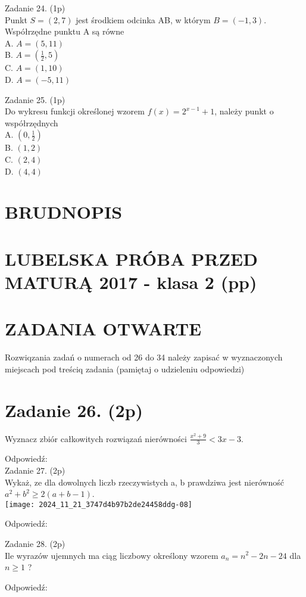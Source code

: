 \documentclass[10pt]{article}
\begin{document}
Zadanie 24. (1p)\\
Punkt \(S=(2,7)\) jest środkiem odcinka AB, w którym \(B=(-1,3)\). Współrzędne punktu A są równe\\
A. \(A=(5,11)\)\\
B. \(A=\left(\frac{1}{2}, 5\right)\)\\
C. \(A=(1,10)\)\\
D. \(A=(-5,11)\)

Zadanie 25. (1p)\\
Do wykresu funkcji określonej wzorem \(f(x)=2^{x-1}+1\), należy punkt o współrzędnych\\
A. \(\left(0, \frac{1}{2}\right)\)\\
B. \((1,2)\)\\
C. \((2,4)\)\\
D. \((4,4)\)

\section*{BRUDNOPIS}
\section*{LUBELSKA PRÓBA PRZED MATURĄ 2017 - klasa 2 (pp)}
\section*{ZADANIA OTWARTE}
Rozwiqzania zadań o numerach od 26 do 34 należy zapisać w wyznaczonych miejscach pod treściq zadania (pamiętaj o udzieleniu odpowiedzi)

\section*{Zadanie 26. (2p)}
Wyznacz zbiór całkowitych rozwiązań nierówności \(\frac{x^{2}+9}{3}<3 x-3\).

Odpowiedź:\\
Zadanie 27. (2p)\\
Wykaż, ze dla dowolnych liczb rzeczywistych a, b prawdziwa jest nierówność \(a^{2}+b^{2} \geq 2(a+b-1)\).\\
\texttt{[image: 2024\_11\_21\_3747d4b97b2de24458ddg-08]}

Odpowiedź:

Zadanie 28. (2p)\\
Ile wyrazów ujemnych ma ciąg liczbowy określony wzorem \(a_{n}=n^{2}-2 n-24\) dla \(n \geq 1\) ?

Odpowiedź:
\end{document}
